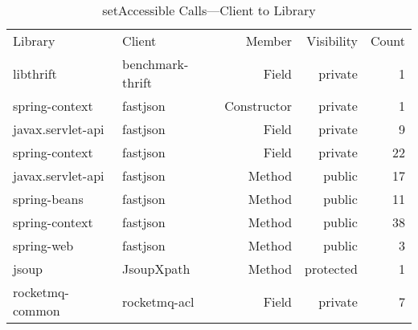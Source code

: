 \begin{table}[ht]
\centering
\begingroup\small
\begin{tabular}{ll!{\color{verylightgray}\vrule}rr!{\color{verylightgray}\vrule}r}
Library & Client & Member & Visibility & Count \\ 
   \hline
libthrift & benchmark-thrift & Field & private & 1 \\ 
  spring-context & fastjson & Constructor & private & 1 \\ 
  javax.servlet-api & fastjson & Field & private & 9 \\ 
  spring-context & fastjson & Field & private & 22 \\ 
  javax.servlet-api & fastjson & Method & public & 17 \\ 
  spring-beans & fastjson & Method & public & 11 \\ 
  spring-context & fastjson & Method & public & 38 \\ 
  spring-web & fastjson & Method & public & 3 \\ 
  jsoup & JsoupXpath & Method & protected & 1 \\ 
  rocketmq-common & rocketmq-acl & Field & private & 7 \\ 
\end{tabular}
\endgroup
\caption{\label{tab:set-accessible-client-to-lib}setAccessible Calls---Client to Library} 
\end{table}
